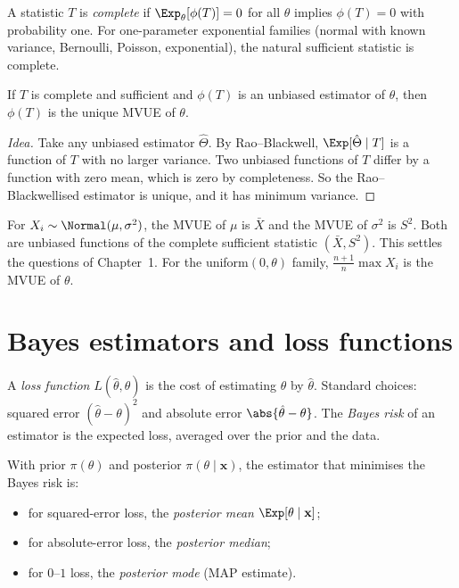 \begin{definition}
A statistic $T$ is \emph{complete} if $\Exp_\theta[\phi(T)]=0$ for all $\theta$ implies $\phi(T)=0$ with probability one. For one-parameter exponential families (normal with known variance, Bernoulli, Poisson, exponential), the natural sufficient statistic is complete.
\end{definition}

\begin{theorem}\label{thm:lehmann}
If $T$ is complete and sufficient and $\phi(T)$ is an unbiased estimator of $\theta$, then $\phi(T)$ is the unique MVUE of $\theta$.
\end{theorem}

\begin{proof}[Idea]
Take any unbiased estimator $\hat\Theta$. By Rao--Blackwell, $\Exp[\hat\Theta\mid T]$ is a function of $T$ with no larger variance. Two unbiased functions of $T$ differ by a function with zero mean, which is zero by completeness. So the Rao--Blackwellised estimator is unique, and it has minimum variance.
\end{proof}

\begin{example}
For $X_i\sim\Normal(\mu,\sigma^2)$, the MVUE of $\mu$ is $\bar{X}$ and the MVUE of $\sigma^2$ is $S^2$. Both are unbiased functions of the complete sufficient statistic $(\bar{X},S^2)$. This settles the questions of Chapter~1. For the uniform$(0,\theta)$ family, $\frac{n+1}n\max X_i$ is the MVUE of $\theta$.
\end{example}

\section{Bayes estimators and loss functions}

A \emph{loss function} $L(\hat\theta,\theta)$ is the cost of estimating $\theta$ by $\hat\theta$. Standard choices: squared error $(\hat\theta-\theta)^2$ and absolute error $\abs{\hat\theta-\theta}$. The \emph{Bayes risk} of an estimator is the expected loss, averaged over the prior and the data.

\begin{theorem}\label{thm:bayes}
With prior $\pi(\theta)$ and posterior $\pi(\theta\mid\mathbf{x})$, the estimator that minimises the Bayes risk is:
\begin{itemize}
  \item for squared-error loss, the \emph{posterior mean} $\Exp[\theta\mid\mathbf{x}]$;
  \item for absolute-error loss, the \emph{posterior median};
  \item for $0$--$1$ loss, the \emph{posterior mode} (MAP estimate).
\end{itemize}
\end{theorem}

